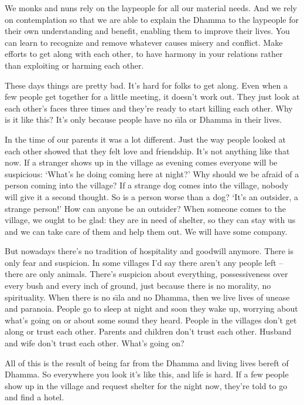 We monks and nuns rely on the laypeople for all our material needs. And we rely on contemplation so that we are able to explain the Dhamma to the laypeople for their own understanding and benefit, enabling them to improve their lives. You can learn to recognize and remove whatever causes misery and conflict. Make efforts to get along with each other, to have harmony in your relations rather than exploiting or harming each other. 

These days things are pretty bad. It's hard for folks to get along. Even when a few people get together for a little meeting, it doesn't work out. They just look at each other's faces three times and they're ready to start killing each other. Why is it like this? It's only because people have no s\={\i}la or Dhamma in their lives. 

In the time of our parents it was a lot different. Just the way people looked at each other showed that they felt love and friendship. It's not anything like that now. If a stranger shows up in the village as evening comes everyone will be suspicious: `What's he doing coming here at night?' Why should we be afraid of a person coming into the village? If a strange dog comes into the village, nobody will give it a second thought. So is a person worse than a dog? `It's an outsider, a strange person!' How can anyone be an outsider? When someone comes to the village, we ought to be glad: they are in need of shelter, so they can stay with us and we can take care of them and help them out. We will have some company. 

But nowadays there's no tradition of hospitality and goodwill anymore. There is only fear and suspicion. In some villages I'd say there aren't any people left -- there are only animals. There's suspicion about everything, possessiveness over every bush and every inch of ground, just because there is no morality, no spirituality. When there is no s\={\i}la and no Dhamma, then we live lives of unease and paranoia. People go to sleep at night and soon they wake up, worrying about what's going on or about some sound they heard. People in the villages don't get along or trust each other. Parents and children don't trust each other. Husband and wife don't trust each other. What's going on? 

All of this is the result of being far from the Dhamma and living lives bereft of Dhamma. So everywhere you look it's like this, and life is hard. If a few people show up in the village and request shelter for the night now, they're told to go and find a hotel. 

